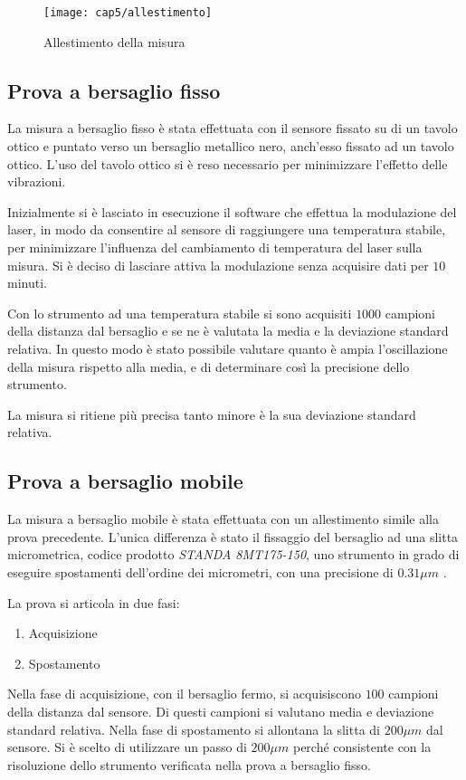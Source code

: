 \begin{figure}  
  \begin{center}
    \texttt{[image: cap5/allestimento]}
    \caption{Allestimento della misura}
  \end{center}
\end{figure}

\subsection{Prova a bersaglio fisso}
La misura a bersaglio fisso è stata effettuata con il sensore fissato su di un tavolo ottico e puntato verso un bersaglio metallico nero, anch'esso fissato ad un tavolo ottico. L'uso del tavolo ottico si è reso necessario per minimizzare l'effetto delle vibrazioni.

Inizialmente si è lasciato in esecuzione il software che effettua la modulazione del laser, in modo da consentire al sensore di raggiungere una temperatura stabile, per minimizzare l'influenza del cambiamento di temperatura del laser sulla misura. Si è deciso di lasciare attiva la modulazione senza acquisire dati per $10$ minuti.

Con lo strumento ad una temperatura stabile si sono acquisiti $1000$ campioni della distanza dal bersaglio e se ne è valutata la media e la deviazione standard relativa. In questo modo è stato possibile valutare quanto è ampia l'oscillazione della misura rispetto alla media, e di determinare così la precisione dello strumento.

La misura si ritiene più precisa tanto minore è la sua deviazione standard relativa.

\subsection{Prova a bersaglio mobile}
La misura a bersaglio mobile è stata effettuata con un allestimento simile alla prova precedente. L'unica differenza è stato il fissaggio del bersaglio ad una slitta micrometrica, codice prodotto \textit{STANDA 8MT175-150}, uno strumento in grado di eseguire spostamenti dell'ordine dei micrometri, con una precisione di $0.31 \mu m$ \cite{standa}.

La prova si articola in due fasi:
\begin{enumerate}
	\item Acquisizione
	\item Spostamento
\end{enumerate}
Nella fase di acquisizione, con il bersaglio fermo, si acquisiscono $100$ campioni della distanza dal sensore. Di questi campioni si valutano media e deviazione standard relativa.
Nella fase di spostamento si allontana la slitta di $200 \mu m$ dal sensore. Si è scelto di utilizzare un passo di $200 \mu m$ perché consistente con la risoluzione dello strumento verificata nella prova a bersaglio fisso.

